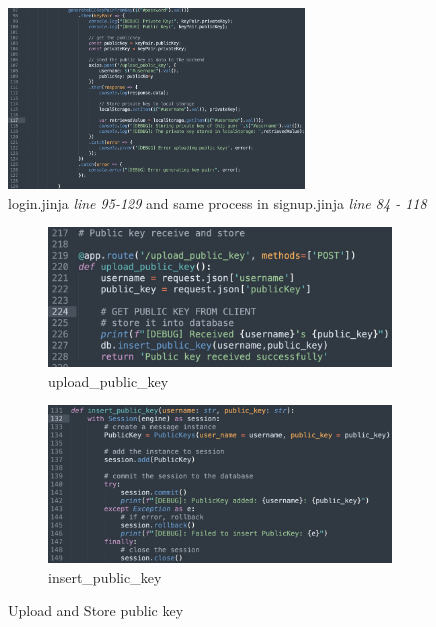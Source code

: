 \documentclass[12pt]{article}
\begin{document}
\begin{enumerate}
            \begin{figure}[H]
                \centering{}
                \includegraphics[width=0.7\textwidth]{graphs/store_key_pairs.jpg}
                \caption{login.jinja \textit{line 95-129} and same process in signup.jinja \textit{line 84 - 118}}
                \label{store_key_pairs}
            \end{figure}

            \begin{figure}[H]
                \centering
                \begin{subfigure}[b]{0.45\textwidth}
                    \centering
                    \includegraphics[width=\textwidth]{graphs/upload_public_key.jpg}
                    \caption{upload\_public\_key}
                \end{subfigure}
                \hfill 
                \begin{subfigure}[b]{0.45\textwidth}
                    \centering
                    \includegraphics[width=\textwidth]{graphs/insert_public_key.jpg}
                    \caption{insert\_public\_key}
                \end{subfigure}
                \caption{Upload and Store public key}
                \label{Upload and Store public key}
            \end{figure}


\end{enumerate}
\end{document}
